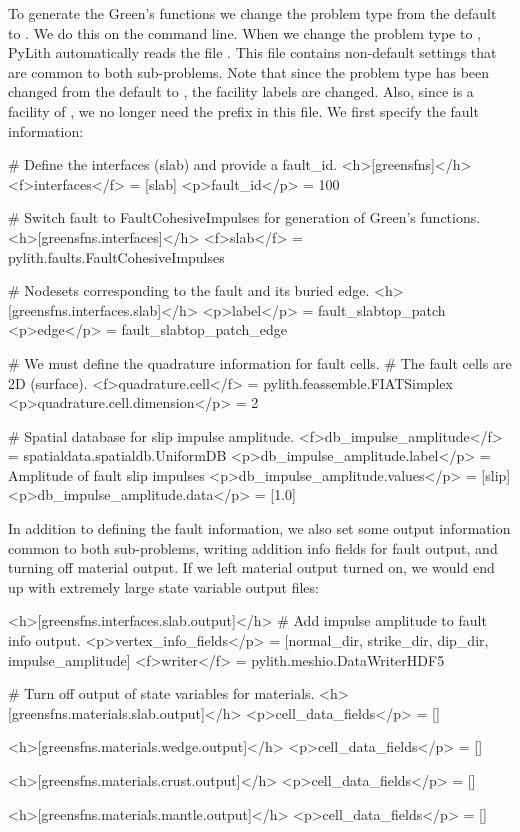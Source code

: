 To generate the Green's functions we change the problem type from the
default  to . We do this
on the command line. When we change the problem type to
, PyLith automatically reads the file
. This file contains non-default settings that
are common to both sub-problems. Note that since the problem type has
been changed from the default  to
, the facility labels are changed. Also, since
 is a facility of , we no longer
need the  prefix in this file. We first specify
the fault information:
\begin{cfg}
# Define the interfaces (slab) and provide a fault_id.
<h>[greensfns]</h>
<f>interfaces</f> = [slab]
<p>fault_id</p> = 100

# Switch fault to FaultCohesiveImpulses for generation of Green's functions.
<h>[greensfns.interfaces]</h>
<f>slab</f> = pylith.faults.FaultCohesiveImpulses

# Nodesets corresponding to the fault and its buried edge.
<h>[greensfns.interfaces.slab]</h>
<p>label</p> = fault_slabtop_patch
<p>edge</p> = fault_slabtop_patch_edge

# We must define the quadrature information for fault cells.
# The fault cells are 2D (surface).
<f>quadrature.cell</f> = pylith.feassemble.FIATSimplex
<p>quadrature.cell.dimension</p> = 2

# Spatial database for slip impulse amplitude.
<f>db_impulse_amplitude</f> = spatialdata.spatialdb.UniformDB
<p>db_impulse_amplitude.label</p> = Amplitude of fault slip impulses
<p>db_impulse_amplitude.values</p> = [slip]
<p>db_impulse_amplitude.data</p> = [1.0]
\end{cfg}

In addition to defining the fault information, we also set some output
information common to both sub-problems, writing addition info fields
for fault output, and turning off material output. If we left material
output turned on, we would end up with extremely large state variable
output files:
\begin{cfg}
<h>[greensfns.interfaces.slab.output]</h>
# Add impulse amplitude to fault info output.
<p>vertex_info_fields</p> = [normal_dir, strike_dir, dip_dir, impulse_amplitude]
<f>writer</f> = pylith.meshio.DataWriterHDF5

# Turn off output of state variables for materials.
<h>[greensfns.materials.slab.output]</h>
<p>cell_data_fields</p> = []

<h>[greensfns.materials.wedge.output]</h>
<p>cell_data_fields</p> = []

<h>[greensfns.materials.crust.output]</h>
<p>cell_data_fields</p> = []

<h>[greensfns.materials.mantle.output]</h>
<p>cell_data_fields</p> = []
\end{cfg}

